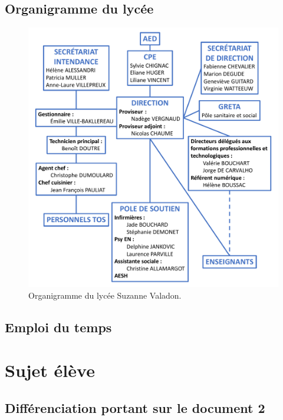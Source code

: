 \documentclass[12pt,a4paper, fleqn]{report}
\begin{document}
\section{Organigramme du lycée}
\label{ann:organigramme}

\begin{figure}[h]
\center
\includegraphics[width=\textwidth]{../../s3/rapport/organigramme.pdf}
\caption{Organigramme du lycée Suzanne Valadon.}
\label{fig:organigramme}
\end{figure}

\section{Emploi du temps}
\label{ann:edt}



\chapter{Sujet élève}

\section{Différenciation portant sur le document 2}
\label{ann:sujet_diff}
\end{document}
